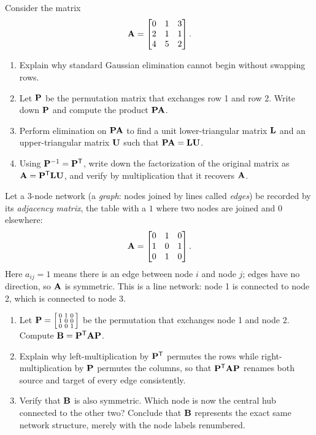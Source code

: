 \begin{exercise}[Elimination with row swaps: \texorpdfstring{$\mat{P}\mat{A}=\mat{L}\mat{U}$}{PA=LU}]\label{ch10:ex-pa-lu}
Consider the matrix
\[
  \mathbf{A} = \begin{bmatrix} 0 & 1 & 3 \\ 2 & 1 & 1 \\ 4 & 5 & 2 \end{bmatrix}.
\]
\begin{enumerate}[label=(\alph*)]
  \item Explain why standard Gaussian elimination cannot begin without swapping rows.
  \item Let $\mathbf{P}$ be the permutation matrix that exchanges row 1 and row 2. Write down $\mathbf{P}$
        and compute the product $\mathbf{P}\mathbf{A}$.
  \item Perform elimination on $\mathbf{P}\mathbf{A}$ to find a unit lower-triangular matrix $\mathbf{L}$ and
        an upper-triangular matrix $\mathbf{U}$ such that $\mat{P}\mat{A} = \mat{L}\mat{U}$.
  \item Using $\mathbf{P}^{-1}=\mathbf{P}^{\mathsf{T}}$, write down the factorization of the original matrix as
        $\mathbf{A} = \mathbf{P}^{\mathsf{T}}\mathbf{L}\mathbf{U}$, and verify by multiplication that it recovers $\mathbf{A}$.
\end{enumerate}
\end{exercise}

\begin{exercise}\label{ch10:ex-graph-iso}
Let a $3$-node network (a \emph{graph}: nodes joined by lines called \emph{edges}) be recorded by
its \emph{adjacency matrix}, the table with a $1$ where two nodes are joined and $0$ elsewhere:
\[
  \mathbf{A} = \begin{bmatrix} 0 & 1 & 0 \\ 1 & 0 & 1 \\ 0 & 1 & 0 \end{bmatrix}.
\]
Here $a_{ij}=1$ means there is an edge between node $i$ and node $j$; edges have no direction, so
$\mathbf{A}$ is symmetric. This is a line network: node 1 is connected to node 2, which is connected
to node 3.
\begin{enumerate}[label=(\alph*)]
  \item Let $\mathbf{P}=\left[\begin{smallmatrix}0&1&0\\1&0&0\\0&0&1\end{smallmatrix}\right]$ be the
        permutation that exchanges node 1 and node 2. Compute $\mathbf{B} = \mathbf{P}^{\mathsf{T}}\mathbf{A}\mathbf{P}$.
  \item Explain why left-multiplication by $\mathbf{P}^{\mathsf{T}}$ permutes the rows while right-multiplication
        by $\mathbf{P}$ permutes the columns, so that $\mathbf{P}^{\mathsf{T}}\mathbf{A}\mathbf{P}$ renames both source and
        target of every edge consistently.
  \item Verify that $\mathbf{B}$ is also symmetric. Which node is now the central hub connected to the
        other two? Conclude that $\mathbf{B}$ represents the exact same network structure, merely with
        the node labels renumbered.
\end{enumerate}
\end{exercise}
